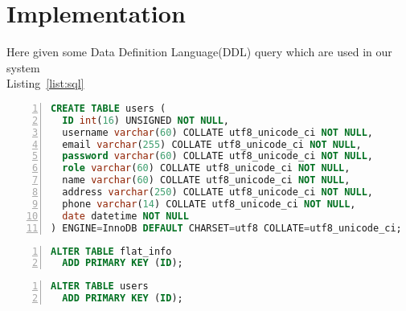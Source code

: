 \section{Implementation}\label{sec:imp}
Here given some Data Definition Language(DDL) query which are used in our system\\
Listing~\ref{list:sql}   
\begin{lstlisting}[caption={ A SQL command for Creating table named USERS}, label=list:sql, captionpos=b,
           backgroundcolor=\color{white},
           language=SQL,
           breaklines=true,
           frame=single,
           showspaces=false,
           basicstyle=\ttfamily,
           numbers=left,
           numberstyle=\tiny,
           rulecolor=\color{red},
           keywordstyle=\color{blue},
           commentstyle=\color{gray}
        ]
CREATE TABLE users (
  ID int(16) UNSIGNED NOT NULL,
  username varchar(60) COLLATE utf8_unicode_ci NOT NULL,
  email varchar(255) COLLATE utf8_unicode_ci NOT NULL,
  password varchar(60) COLLATE utf8_unicode_ci NOT NULL,
  role varchar(60) COLLATE utf8_unicode_ci NOT NULL,
  name varchar(60) COLLATE utf8_unicode_ci NOT NULL,
  address varchar(250) COLLATE utf8_unicode_ci NOT NULL,
  phone varchar(14) COLLATE utf8_unicode_ci NOT NULL,
  date datetime NOT NULL
) ENGINE=InnoDB DEFAULT CHARSET=utf8 COLLATE=utf8_unicode_ci;
\end{lstlisting}
	\begin{lstlisting}[caption={A SQL command for setting primary key. }, label=list:sql, captionpos=b,
           backgroundcolor=\color{white},
           language=SQL,
           breaklines=true,
           frame=single,
           showspaces=false,
           basicstyle=\ttfamily,
           numbers=left,
           numberstyle=\tiny,
           rulecolor=\color{red},
           keywordstyle=\color{blue},
           commentstyle=\color{gray}
        ]		 
 ALTER TABLE flat_info
  ADD PRIMARY KEY (ID);
\end{lstlisting}
\begin{lstlisting}[caption={A SQL command for setting primary key.}, label=list:sql, captionpos=b,
           backgroundcolor=\color{white},
           language=SQL,
           breaklines=true,
           frame=single,
           showspaces=false,
           basicstyle=\ttfamily,
           numbers=left,
           numberstyle=\tiny,
           rulecolor=\color{red},
           keywordstyle=\color{blue},
           commentstyle=\color{gray}
           ]
ALTER TABLE users
  ADD PRIMARY KEY (ID);
\end{lstlisting}
